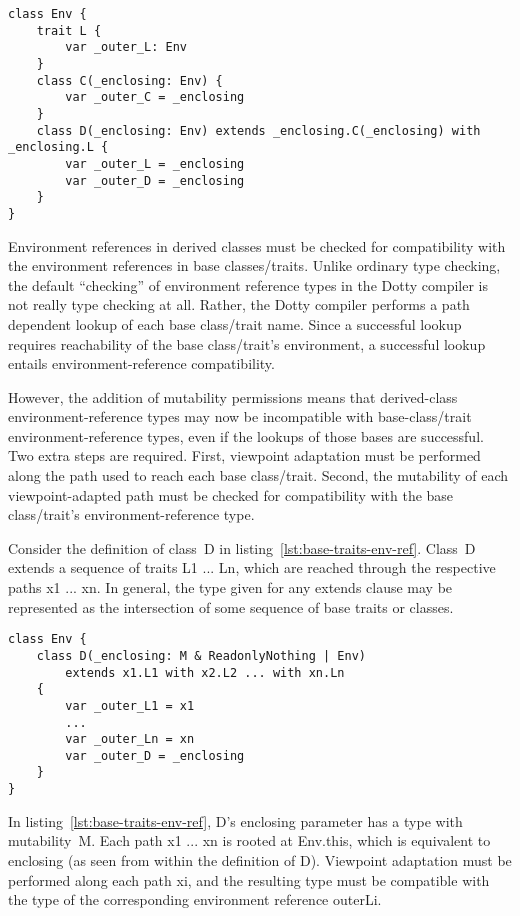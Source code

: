 \begin{lstlisting}[float=htbp, caption={Base Class and Trait with Environment References}, label={lst:base-class-trait-env-ref}]
class Env {
	trait L {
		var _outer_L: Env
	}
	class C(_enclosing: Env) {
		var _outer_C = _enclosing
	}
	class D(_enclosing: Env) extends _enclosing.C(_enclosing) with _enclosing.L {
		var _outer_L = _enclosing
		var _outer_D = _enclosing
	}
}
\end{lstlisting}

Environment references in derived classes must be checked for compatibility with the environment references in base classes/traits. Unlike ordinary type checking, the default ``checking'' of environment reference types in the Dotty compiler is not really type checking at all. Rather, the Dotty compiler performs a path dependent lookup of each base class/trait name. Since a successful lookup requires reachability of the base class/trait's environment, a successful lookup entails environment-reference compatibility.

However, the addition of mutability permissions means that derived-class environment-reference types may now be incompatible with base-class/trait environment-reference types, even if the lookups of those bases are successful. Two extra steps are required. First, viewpoint adaptation must be performed along the path used to reach each base class/trait. Second, the mutability of each viewpoint-adapted path must be checked for compatibility with the base class/trait's environment-reference type.

Consider the definition of class~{\cd D} in listing~\ref{lst:base-traits-env-ref}. Class~{\cd D} extends a sequence of traits {\cd L1} ... {\cd Ln}, which are reached through the respective paths {\cd x1} ... {\cd xn}. In general, the type given for any {\cd extends} clause may be represented as the intersection of some sequence of base traits or classes.

\begin{lstlisting}[float=htbp, caption={Base Traits with Environment References}, label={lst:base-traits-env-ref}]
class Env {
	class D(_enclosing: M & ReadonlyNothing | Env)
		extends x1.L1 with x2.L2 ... with xn.Ln
	{
		var _outer_L1 = x1
		...
		var _outer_Ln = xn
		var _outer_D = _enclosing
	}
}
\end{lstlisting}

In listing~\ref{lst:base-traits-env-ref}, \mbox{{\cd D}'s} {\cd \und enclosing} parameter has a type with mutability~{\cd M}.
Each path {\cd x1} ... {\cd xn} is rooted at {\cd Env.this}, which is equivalent to {\cd \und enclosing} (as seen from within the definition of {\cd D}).
Viewpoint adaptation must be performed along each path {\cd xi}, and the resulting type must be compatible with the type of the corresponding environment reference {\cd\und outer\und Li}.


